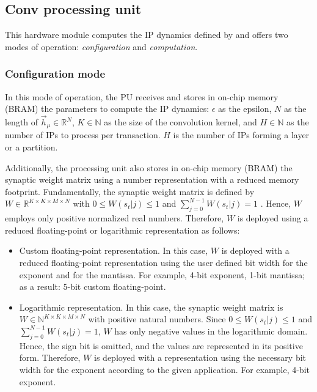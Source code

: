 \subsection{Conv processing unit}
This hardware module computes the IP dynamics defined by  and offers two modes of operation: \emph{configuration} and \emph{computation}.

\subsubsection{Configuration mode}
In this mode of operation, the PU receives and stores in on-chip memory (BRAM) the parameters to compute the IP dynamics: $\epsilon$ as the epsilon, $N$ as the length of $\vec{h}_\mu\in\mathbb{R}^{N}$, $K\in\mathbb{N}$ as the size of the convolution kernel, and $H\in\mathbb{N}$ as the number of IPs to process per transaction. $H$ is the number of IPs forming a layer or a partition.

Additionally, the processing unit also stores in on-chip memory (BRAM) the synaptic weight matrix using a number representation with a reduced memory footprint. Fundamentally, the synaptic weight matrix is defined by $W\in\mathbb{R}^{K\times K\times M\times N}$ with $0\le W(s_t|j)\le1$ and $\sum_{j=0}^{N-1}W(s_t|j)=1$ \cite{rotermund2019Backpropagation}. Hence, $W$ employs only positive normalized real numbers. Therefore, $W$ is deployed using a reduced floating-point or logarithmic representation as follows:

\begin{itemize}
	\item{Custom floating-point representation}.
	In this case, $W$ is deployed with a reduced floating-point representation using the user defined bit width for the exponent and for the mantissa. For example, 4-bit exponent, 1-bit mantissa; as a result: 5-bit custom floating-point.
	\item{Logarithmic representation}.
	In this case, the synaptic weight matrix is $W\in\mathbb{N}^{K\times K\times M\times N}$ with positive natural numbers. Since $0\le W(s_t|j)\le1$ and $\sum_{j=0}^{N-1}W(s_t|j)=1$, $W$ has only negative values in the logarithmic domain. Hence, the sign bit is omitted, and the values are represented in its positive form. Therefore, $W$ is deployed with a representation using the necessary bit width for the exponent according to the given application. For example, 4-bit exponent.
\end{itemize}

